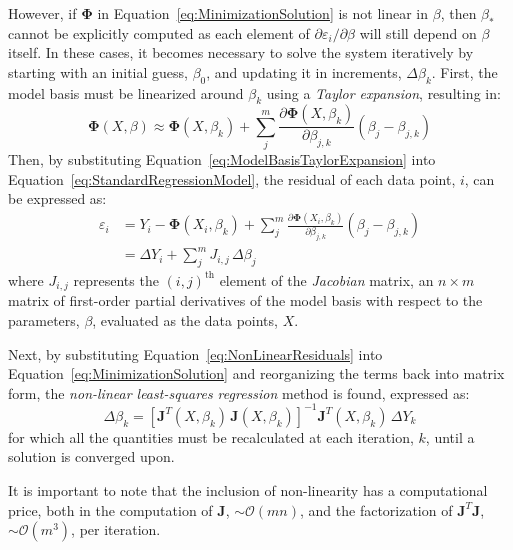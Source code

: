 \documentclass{article}
\begin{document}
However, if $\mathbf{\Phi}$ in Equation~\eqref{eq:MinimizationSolution} is not linear in $\beta$, then $\beta_*$ cannot be explicitly computed as each element of $\partial\varepsilon_i/\partial\beta$ will still depend on $\beta$ itself. In these cases, it becomes necessary to solve the system iteratively by starting with an initial guess, $\beta_0$, and updating it in increments, $\Delta \beta_k$. First, the model basis must be linearized around $\beta_k$ using a \emph{Taylor expansion}, resulting in:
\begin{equation}
\label{eq:ModelBasisTaylorExpansion}
	\mathbf{\Phi}\!\left(X,\beta\right) \approx \mathbf{\Phi}\!\left(X,\beta_k\right) + \sum_{j}^{m} \frac{\partial \mathbf{\Phi}\!\left(X,\beta_k\right)}{\partial \beta_{j,k}} \left(\beta_j - \beta_{j,k}\right)
\end{equation}
Then, by substituting Equation~\eqref{eq:ModelBasisTaylorExpansion} into Equation~\eqref{eq:StandardRegressionModel}, the residual of each data point, $i$, can be expressed as:
\begin{equation}
\label{eq:NonLinearResiduals}
	\begin{aligned}
	\varepsilon_i &= Y_i - \mathbf{\Phi}\!\left(X_i,\beta_k\right) + \sum_{j}^{m} \frac{\partial \mathbf{\Phi}\!\left(X_i,\beta_k\right)}{\partial \beta_{j,k}} \left(\beta_j - \beta_{j,k}\right) \\
	&= \Delta Y_i + \sum_{j}^{m} J_{i,j} \, \Delta \beta_j
	\end{aligned}
\end{equation}
where $J_{i,j}$ represents the $\left(i,j\right)^{\text{th}}$ element of the \emph{Jacobian} matrix, an $n \times m$ matrix of first-order partial derivatives of the model basis with respect to the parameters, $\beta$, evaluated as the data points, $X$.

Next, by substituting Equation~\eqref{eq:NonLinearResiduals} into Equation~\eqref{eq:MinimizationSolution} and reorganizing the terms back into matrix form, the \emph{non-linear least-squares regression} method is found, expressed as:
\begin{equation}
\label{eq:NonLinearLeastSquaresRegression}
	\Delta \beta_k = \left[\mathbf{J}^T\!\left(X,\beta_k\right) \, \mathbf{J}\!\left(X,\beta_k\right)\right]^{-1} \mathbf{J}^T\!\left(X,\beta_k\right) \, \Delta Y_k
\end{equation}
for which all the quantities must be recalculated at each iteration, $k$, until a solution is converged upon.

It is important to note that the inclusion of non-linearity has a computational price, both in the computation of $\mathbf{J}$, $\sim\mathcal{O}\left(mn\right)$, and the factorization of $\mathbf{J}^T\mathbf{J}$, $\sim\mathcal{O}\left(m^3\right)$, per iteration.
\end{document}
